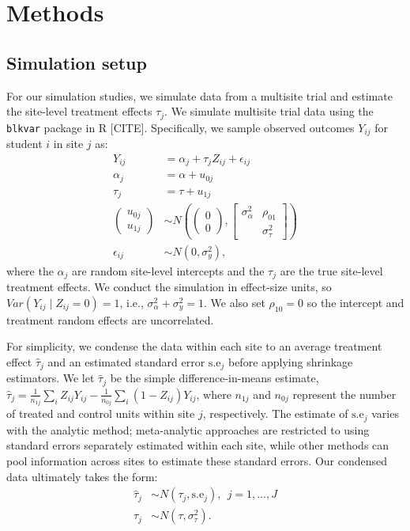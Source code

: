 \documentclass[]{article}
\begin{document}

\section{Methods}

\subsection{Simulation setup}

For our simulation studies, we simulate data from a multisite trial and estimate the site-level treatment effects $\tau_j$.
We simulate multisite trial data using the \texttt{blkvar} package in R [CITE].
Specifically, we sample observed outcomes $Y_{ij}$ for student $i$ in site $j$ as:
\begin{align*}
	Y_{ij} &= \alpha_j + \tau_j Z_{ij} + \epsilon_{ij} \\
	\alpha_j &= \alpha + u_{0j} \\
	\tau_j &= \tau + u_{1j} \\
	\begin{pmatrix}
		u_{0j} \\ u_{1j}
	\end{pmatrix} &\sim N\left(
	\begin{pmatrix}
		0 \\ 0
	\end{pmatrix}, 
	\begin{bmatrix}
		\sigma^2_\alpha & \rho_{01} \\  & \sigma^2_\tau
	\end{bmatrix}\right) \\
	\epsilon_{ij} &\sim N(0, \sigma^2_y) ,
\end{align*}
where the $\alpha_j$ are random site-level intercepts and the $\tau_j$ are the true site-level treatment effects.
We conduct the simulation in effect-size units, so $Var(Y_{ij} \mid Z_{ij}=0)=1$, i.e., $\sigma^2_\alpha + \sigma^2_y = 1$.
We also set $\rho_{10}=0$ so the intercept and treatment random effects are uncorrelated.

For simplicity, we condense the data within each site to an average treatment effect $\hat{\tau}_j$ and an estimated standard error $\text{s.e}_j$ before applying shrinkage estimators.
We let $\hat{\tau}_j$ be the simple difference-in-means estimate, $\hat{\tau}_j = \frac{1}{n_{1j}} \sum_i Z_{ij}Y_{ij} - \frac{1}{n_{0j}} \sum_i (1-Z_{ij})Y_{ij}$, where $n_{1j}$ and $n_{0j}$ represent the number of treated and control units within site $j$, respectively.
The estimate of $\text{s.e}_j$ varies with the analytic method; meta-analytic approaches are restricted to using standard errors separately estimated within each site, while other methods can pool information across sites to estimate these standard errors.
Our condensed data ultimately takes the form:
\begin{align*}
    \hat{\tau}_j &\sim N(\tau_j, \text{s.e}_j), \ \ j=1,\dots,J \\
    \tau_j &\sim N(\tau, \sigma_\tau^2).
\end{align*}
\end{document}
